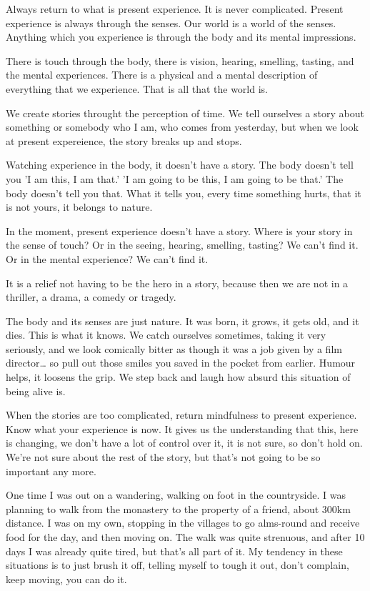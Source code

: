 Always return to what is present experience. It is never complicated.
Present experience is always through the senses. Our world is a world of
the senses. Anything which you experience is through the body and its
mental impressions.

There is touch through the body, there is vision, hearing, smelling,
tasting, and the mental experiences. There is a physical and a mental
description of everything that we experience. That is all that the world
is.

We create stories throught the perception of time. We tell ourselves a
story about something or somebody who I am, who comes from yesterday,
but when we look at present expereience, the story breaks up and stops.

Watching experience in the body, it doesn't have a story. The body
doesn't tell you 'I am this, I am that.' 'I am going to be this, I am
going to be that.' The body doesn't tell you that. What it tells you,
every time something hurts, that it is not yours, it belongs to nature.

In the moment, present experience doesn't have a story. Where is your
story in the sense of touch? Or in the seeing, hearing, smelling,
tasting? We can't find it. Or in the mental experience? We can't find
it.

It is a relief not having to be the hero in a story, because then we are
not in a thriller, a drama, a comedy or tragedy.

The body and its senses are just nature. It was born, it grows, it gets
old, and it dies. This is what it knows. We catch ourselves sometimes,
taking it very seriously, and we look comically bitter as though it was
a job given by a film director\ldots{} so pull out those smiles you
saved in the pocket from earlier. Humour helps, it loosens the grip. We
step back and laugh how absurd this situation of being alive is.

When the stories are too complicated, return mindfulness to present
experience. Know what your experience is now. It gives us the
understanding that this, here is changing, we don't have a lot of
control over it, it is not sure, so don't hold on. We're not sure about
the rest of the story, but that's not going to be so important any more.

One time I was out on a wandering, walking on foot in the countryside. I
was planning to walk from the monastery to the property of a friend,
about 300km distance. I was on my own, stopping in the villages to go
alms-round and receive food for the day, and then moving on. The walk
was quite strenuous, and after 10 days I was already quite tired, but
that's all part of it. My tendency in these situations is to just brush
it off, telling myself to tough it out, don't complain, keep moving, you
can do it.

